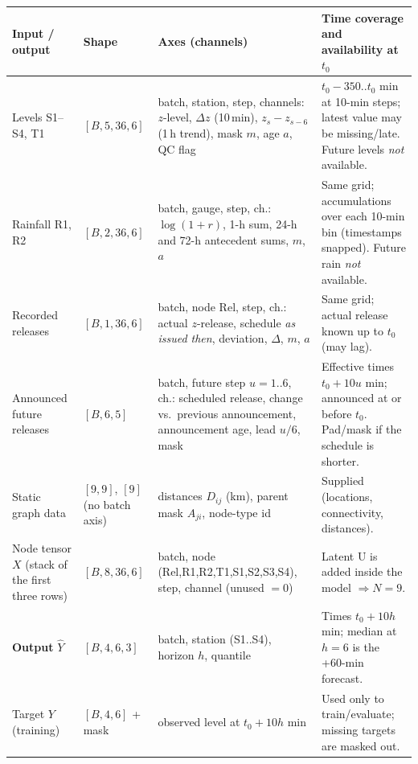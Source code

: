\begin{table}[H]\centering\scriptsize
\renewcommand{\arraystretch}{1.1}
\begin{tabularx}{\linewidth}{@{}>{\raggedright\arraybackslash}p{2.35cm}>{\raggedright\arraybackslash}p{2.9cm}>{\raggedright\arraybackslash}p{4.05cm}>{\raggedright\arraybackslash}X@{}}
\toprule
Input / output & Shape & Axes (channels) & Time coverage and availability at $t_0$ \\ \midrule
Levels S1--S4, T1 & $[B,5,36,6]$ & batch, station, step, channels: $z$-level, $\Delta z$ (10\,min), $z_s{-}z_{s-6}$ (1\,h trend), mask $m$, age $a$, QC flag & $t_0{-}350..t_0$ min at 10-min steps; latest value may be missing/late. Future levels \emph{not} available.\\
Rainfall R1, R2 & $[B,2,36,6]$ & batch, gauge, step, ch.: $\log(1{+}r)$, 1-h sum, 24-h and 72-h antecedent sums, $m$, $a$ & Same grid; accumulations over each 10-min bin (timestamps snapped). Future rain \emph{not} available.\\
Recorded releases & $[B,1,36,6]$ & batch, node Rel, step, ch.: actual $z$-release, schedule \emph{as issued then}, deviation, $\Delta$, $m$, $a$ & Same grid; actual release known up to $t_0$ (may lag).\\
Announced future releases & $[B,6,5]$ & batch, future step $u{=}1..6$, ch.: scheduled release, change vs.\ previous announcement, announcement age, lead $u/6$, mask & Effective times $t_0{+}10u$ min; announced at or before $t_0$. Pad/mask if the schedule is shorter.\\
Static graph data & $[9,9]$, $[9]$ (no batch axis) & distances $D_{ij}$ (km), parent mask $A_{ji}$, node-type id & Supplied (locations, connectivity, distances).\\
Node tensor $X$ (stack of the first three rows) & $[B,8,36,6]$ & batch, node (Rel,R1,R2,T1,S1,S2,S3,S4), step, channel (unused $=0$) & Latent U is added inside the model $\Rightarrow N{=}9$.\\ \midrule
\textbf{Output} $\hat Y$ & $[B,4,6,3]$ & batch, station (S1..S4), horizon $h$, quantile & Times $t_0{+}10h$ min; median at $h{=}6$ is the +60-min forecast.\\
Target $Y$ (training) & $[B,4,6]$ + mask & observed level at $t_0{+}10h$ min & Used only to train/evaluate; missing targets are masked out.\\ \bottomrule
\end{tabularx}
\end{table}
